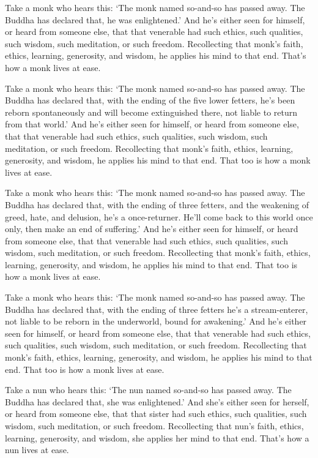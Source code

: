 \documentclass[12pt,openany]{book}%
\begin{document}
Take a monk who hears this: ‘The monk named so-and-so has passed away. The Buddha has declared that, he was enlightened.’ And he’s either seen for himself, or heard from someone else, that that venerable had such ethics, such qualities, such wisdom, such meditation, or such freedom. Recollecting that monk’s faith, ethics, learning, generosity, and wisdom, he applies his mind to that end. That’s how a monk lives at ease. 

Take a monk who hears this: ‘The monk named so-and-so has passed away. The Buddha has declared that, with the ending of the five lower fetters, he’s been reborn spontaneously and will become extinguished there, not liable to return from that world.’ And he’s either seen for himself, or heard from someone else, that that venerable had such ethics, such qualities, such wisdom, such meditation, or such freedom. Recollecting that monk’s faith, ethics, learning, generosity, and wisdom, he applies his mind to that end. That too is how a monk lives at ease. 

Take a monk who hears this: ‘The monk named so-and-so has passed away. The Buddha has declared that, with the ending of three fetters, and the weakening of greed, hate, and delusion, he’s a once-returner. He’ll come back to this world once only, then make an end of suffering.’ And he’s either seen for himself, or heard from someone else, that that venerable had such ethics, such qualities, such wisdom, such meditation, or such freedom. Recollecting that monk’s faith, ethics, learning, generosity, and wisdom, he applies his mind to that end. That too is how a monk lives at ease. 

Take a monk who hears this: ‘The monk named so-and-so has passed away. The Buddha has declared that, with the ending of three fetters he’s a stream-enterer, not liable to be reborn in the underworld, bound for awakening.’ And he’s either seen for himself, or heard from someone else, that that venerable had such ethics, such qualities, such wisdom, such meditation, or such freedom. Recollecting that monk’s faith, ethics, learning, generosity, and wisdom, he applies his mind to that end. That too is how a monk lives at ease. 

Take a nun who hears this: ‘The nun named so-and-so has passed away. The Buddha has declared that, she was enlightened.’ And she’s either seen for herself, or heard from someone else, that that sister had such ethics, such qualities, such wisdom, such meditation, or such freedom. Recollecting that nun’s faith, ethics, learning, generosity, and wisdom, she applies her mind to that end. That’s how a nun lives at ease. 
\end{document}
